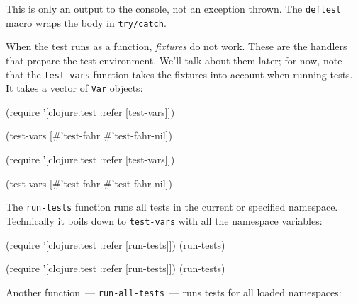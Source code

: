 \fi

This is only an output to the console, not an exception thrown. The \verb|deftest| macro wraps the body in \verb|try/catch|.

When the test runs as a function, \emph{fixtures} do not work. These are the handlers that prepare the test environment. We'll talk about them later; for now, note that the \verb|test-vars| function takes the fixtures into account when running tests. It takes a vector of \verb|Var| objects:

\ifnarrow

\begin{english}
  \begin{clojure}
(require
  '[clojure.test :refer [test-vars]])

(test-vars
  [#'test-fahr #'test-fahr-nil])
  \end{clojure}
\end{english}

\else

\begin{english}
  \begin{clojure}
(require '[clojure.test :refer [test-vars]])

(test-vars [#'test-fahr #'test-fahr-nil])
  \end{clojure}
\end{english}

\fi


The \verb|run-tests| function runs all tests in the current or specified namespace. Technically it boils down to \verb|test-vars| with all the namespace variables:

\ifnarrow

\begin{english}
  \begin{clojure}
(require
  '[clojure.test :refer [run-tests]])
(run-tests)
  \end{clojure}
\end{english}

\else

\begin{english}
  \begin{clojure}
(require '[clojure.test :refer [run-tests]])
(run-tests)
  \end{clojure}
\end{english}

\fi

Another function~--- \verb|run-all-tests|~--- runs tests for all loaded namespaces:

